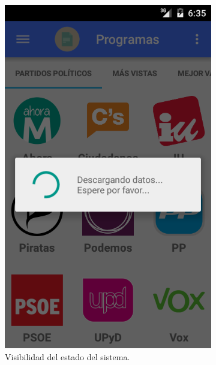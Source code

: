 \begin{figure}[H]
        \centering
        \begin{subfigure}[b]{0.3\textwidth}
                \includegraphics[width=\textwidth]{Media/Captures/principio01.png}
                \caption{Visibilidad del estado del sistema.}
                \label{fig:designPrinciplesVisibility}
        \end{subfigure}
        ~
        \begin{subfigure}[b]{0.3\textwidth}

\end{subfigure}
\end{figure}
